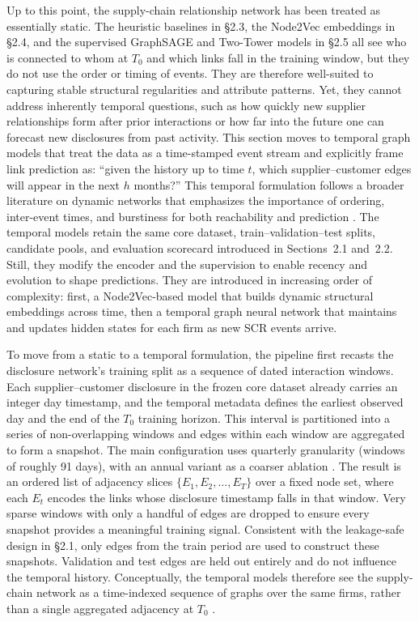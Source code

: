 Up to this point, the supply-chain relationship network has been treated as essentially static. The heuristic baselines in \S2.3, the Node2Vec embeddings in \S2.4, and the supervised GraphSAGE and Two-Tower models in \S2.5 all see who is connected to whom at \(T_0\) and which links fall in the training window, but they do not use the order or timing of events. They are therefore well-suited to capturing stable structural regularities and attribute patterns. Yet, they cannot address inherently temporal questions, such as how quickly new supplier relationships form after prior interactions or how far into the future one can forecast new disclosures from past activity. This section moves to temporal graph models that treat the data as a time-stamped event stream and explicitly frame link prediction as: ``given the history up to time \(t\), which supplier--customer edges will appear in the next \(h\) months?'' This temporal formulation follows a broader literature on dynamic networks that emphasizes the importance of ordering, inter-event times, and burstiness for both reachability and prediction \parencite{holme_temporal_2012,masuda_guide_2020,kazemi_representation_2020}. The temporal models retain the same core dataset, train--validation--test splits, candidate pools, and evaluation scorecard introduced in Sections~2.1 and~2.2. Still, they modify the encoder and the supervision to enable recency and evolution to shape predictions. They are introduced in increasing order of complexity: first, a Node2Vec-based model that builds dynamic structural embeddings across time, then a temporal graph neural network that maintains and updates hidden states for each firm as new SCR events arrive.

To move from a static to a temporal formulation, the pipeline first recasts the disclosure network's training split as a sequence of dated interaction windows. Each supplier--customer disclosure in the frozen core dataset already carries an integer day timestamp, and the temporal metadata defines the earliest observed day and the end of the \(T_0\) training horizon. This interval is partitioned into a series of non-overlapping windows and edges within each window are aggregated to form a snapshot. The main configuration uses quarterly granularity (windows of roughly 91 days), with an annual variant as a coarser ablation \parencite{holme_temporal_2012}. The result is an ordered list of adjacency slices \(\{E_1, E_2, \dots, E_T\}\) over a fixed node set, where each \(E_t\) encodes the links whose disclosure timestamp falls in that window. Very sparse windows with only a handful of edges are dropped to ensure every snapshot provides a meaningful training signal. Consistent with the leakage-safe design in \S2.1, only edges from the train period are used to construct these snapshots. Validation and test edges are held out entirely and do not influence the temporal history. Conceptually, the temporal models therefore see the supply-chain network as a time-indexed sequence of graphs over the same firms, rather than a single aggregated adjacency at \(T_0\) \parencite{kazemi_representation_2020}.

